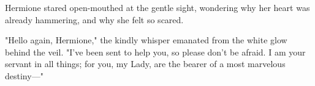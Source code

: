 Hermione stared open-mouthed at the gentle sight, wondering why her heart was
already hammering, and why she felt so scared.

"Hello again, Hermione," the kindly whisper emanated from the white glow behind
the veil. "I've been sent to help you, so please don't be afraid. I am your
servant in all things; for you, my Lady, are the bearer of a most marvelous
destiny—"

\begin{center}
{\el}

{\el}

{\el}
\end{center}
